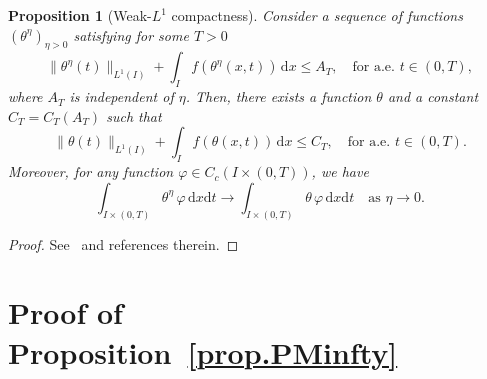 \documentclass[11pt]{amsart}
\newtheorem{proposition}{Proposition}
\newcommand{\dd}{\mathrm{d}}
\begin{document}
\begin{appendix}
\begin{proposition}[Weak-$L^1$ compactness] \label{weak star convergence} 
Consider a sequence of functions $(\theta^{\eta})_{\eta >0}$ satisfying for some $T>0$
\[
\|\theta^{\eta}(t)\|_{L^1(I)} + \int_{I} f\left(\theta^{\eta}(x,t)\right) \, \dd x \leq A_T, \quad \mbox{for a.e. } t \in (0, T),
\]
where $A_T$ is independent of $\eta$. Then, there exists a function $\theta$ and a constant $C_T=C_T(A_T)$ such that 
\[
\|\theta(t)\|_{L^1(I)} + \int_{I} f\left(\theta(x,t)\right) \, \dd x \leq C_T, \quad \mbox{for a.e. } t \in (0, T).
\]
Moreover, for any function $\varphi \in C_c (I\times(0,T))$, we have 
\[
\int_{I\times (0,T)} \theta^{\eta} \, \varphi \, \dd x \dd t \rightarrow \int_{I \times (0, T)} \theta \, \varphi \, \dd x \dd t \quad \mbox{as }\eta \to 0.
\]
\end{proposition}

\begin{proof}
See~\cite[Proposition 4.6]{2} and references therein.
\end{proof}

\section{Proof of Proposition~\ref{prop.PMinfty}}\label{app.proofPMinfty}


\end{appendix}
\end{document}
